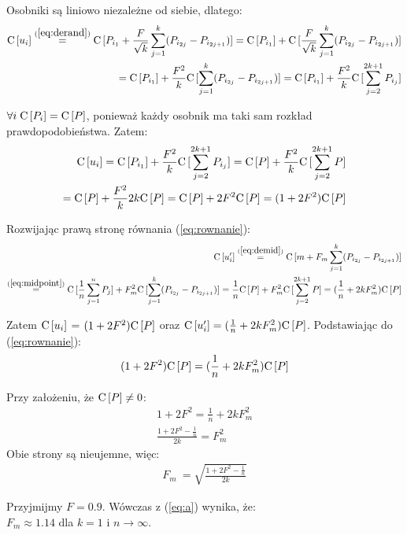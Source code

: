 \documentclass[12pt, a4paper]{article}
\def\C{{\rm C}\,}
\begin{document}
Osobniki są liniowo niezależne od siebie, dlatego:
\begin{align*}
\C[u_i] \overset{(\ref{eq:derand})}{=} \C[P_{i_1} + \frac{F}{\sqrt{k}}\sum\limits_{j=1}^k (P_{i_{2j}} - P_{i_{2j+1}})] = \C[P_{i_1}] + \C[\frac{F}{\sqrt{k}}\sum\limits_{j=1}^k (P_{i_{2j}} - P_{i_{2j+1}})] \\
= \C[P_{i_1}] + \frac{F^2}{k}\C[\sum\limits_{j=1}^k (P_{i_{2j}} - P_{i_{2j+1}})] = \C[P_{i_1}] + \frac{F^2}{k}\C[\sum\limits_{j=2}^{2k+1} P_{i_{j}}]
\end{align*}

$\forall{i}\hspace{1mm}\C[P_i] = \C[P]$, ponieważ każdy osobnik ma taki sam rozkład prawdopodobieństwa. Zatem:
\begin{align*} 
\C[u_i] = \C[P_{i_1}] + \frac{F^2}{k}\C[\sum\limits_{j=2}^{2k+1} P_{i_{j}}] = \C[P] + \frac{F^2}{k}\C[\sum\limits_{j=2}^{2k+1} P] \\
= \C[P] + \frac{F^2}{k}2k\C[P] = \C[P] + 2F^2\C[P] = (1 + 2F^2)\C[P]
\end{align*}

Rozwijając prawą stronę równania (\ref{eq:rownanie}):
\begin{align*}
\C[u_i'] \overset{(\ref{eq:demid})}{=} \C[m + F_m\sum\limits_{j=1}^k (P_{i_{2j}} - P_{i_{2j+1}})] \\
\overset{(\ref{eq:midpoint})}{=} \C[\frac{1}{n}\sum\limits_{j=1}^n P_j] + F_m^2\C[\sum\limits_{j=1}^k (P_{i_{2j}} - P_{i_{2j+1}})] 
= \frac{1}{n}\C[P] + F_m^2\C[\sum\limits_{j=2}^{2k+1} P] = (\frac{1}{n} + 2kF_m^2)\C[P]
\end{align*}

Zatem $\C[u_i]$ = $(1 + 2F^2)\C[P]$ oraz $\C[u_i'] = (\frac{1}{n} + 2kF_m^2)\C[P]$. Podstawiając do (\ref{eq:rownanie}):
\begin{align*}
(1 + 2F^2)\C[P] = (\frac{1}{n} + 2kF_m^2)\C[P]
\end{align*}

Przy założeniu, że $\C[P] \neq 0$:
\begin{align*}
1 + 2F^2 = \frac{1}{n} + 2kF_m^2 \\
\frac{1 + 2F^2 - \frac{1}{n}}{2k} = F_m^2
\end{align*}
Obie strony są nieujemne, więc:
\begin{align} \label{eq:a}
F_m\ = \sqrt{\frac{1 + 2F^2 - \frac{1}{n}}{2k}}
\end{align}

Przyjmijmy $F=0.9$. Wówczas z (\ref{eq:a}) wynika, że: \\
$F_m \approx 1.14$ dla $k=1$ i $n\to\infty$. \\
\end{document}
